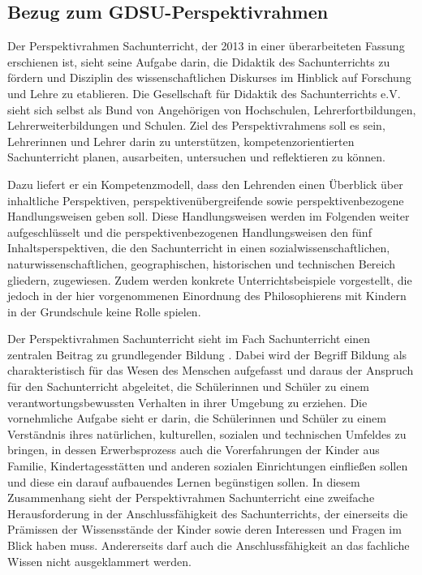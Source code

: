 \newpage
\subsection{Bezug zum GDSU-Perspektivrahmen }

Der Perspektivrahmen Sachunterricht, der 2013 in einer überarbeiteten Fassung erschienen ist, sieht seine Aufgabe darin, die Didaktik des Sachunterrichts zu fördern und Disziplin des wissenschaftlichen Diskurses im Hinblick auf Forschung und Lehre zu etablieren. 
Die Gesellschaft für Didaktik des Sachunterrichts e.V. sieht sich selbst als Bund von Angehörigen von Hochschulen, Lehrerfortbildungen, Lehrerweiterbildungen und Schulen. 
Ziel des Perspektivrahmens soll es sein, Lehrerinnen und Lehrer darin zu unterstützen, kompetenzorientierten Sachunterricht planen, ausarbeiten, untersuchen und reflektieren zu können.

Dazu liefert er ein Kompetenzmodell, dass den Lehrenden einen Überblick über inhaltliche Perspektiven, perspektivenübergreifende sowie perspektivenbezogene Handlungsweisen geben soll. 
Diese Handlungsweisen werden im Folgenden weiter aufgeschlüsselt und die perspektivenbezogenen Handlungsweisen den fünf Inhaltsperspektiven, die den Sachunterricht in einen sozialwissenschaftlichen, naturwissenschaftlichen, geographischen, historischen und technischen Bereich gliedern, zugewiesen\cite[S.\,5f]{GDS13}.
 Zudem werden konkrete Unterrichtsbeispiele vorgestellt, die jedoch in der hier vorgenommenen Einordnung des Philosophierens mit Kindern in der Grundschule keine Rolle spielen.
 
Der Perspektivrahmen Sachunterricht sieht im Fach Sachunterricht einen \glqq zentralen Beitrag zu grundlegender Bildung\grqq{} \cite[S.\,9]{GDS13}.
Dabei wird der Begriff Bildung als charakteristisch für das Wesen des Menschen aufgefasst und daraus der Anspruch für den Sachunterricht abgeleitet, die Schülerinnen und Schüler zu einem verantwortungsbewussten Verhalten in ihrer Umgebung zu erziehen. 
Die vornehmliche Aufgabe sieht er darin, die Schülerinnen und Schüler zu einem Verständnis ihres natürlichen, kulturellen, sozialen und technischen Umfeldes zu bringen, in dessen Erwerbsprozess auch die Vorerfahrungen der Kinder aus Familie, Kindertagesstätten und anderen sozialen Einrichtungen einfließen sollen und diese ein darauf aufbauendes Lernen begünstigen sollen. 
In diesem Zusammenhang sieht der Perspektivrahmen Sachunterricht eine zweifache Herausforderung in der Anschlussfähigkeit des Sachunterrichts, der einerseits die Prämissen der Wissensstände der Kinder sowie deren Interessen und Fragen im Blick haben muss. 
Andererseits darf auch die Anschlussfähigkeit an das fachliche Wissen nicht ausgeklammert werden. 

